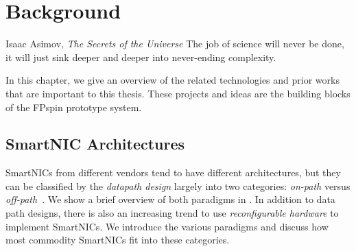 \chapter{Background}
\begin{chapquote}{Isaac Asimov, \textit{The Secrets of the Universe}}
The job of science will never be done, it will just sink deeper and deeper into never-ending complexity.
\end{chapquote}

In this chapter, we give an overview of the related technologies and prior works that are important to this thesis.  These projects and ideas are the building blocks of the FP\acs{spin} prototype system.

\section{SmartNIC Architectures}

SmartNICs from different vendors tend to have different architectures, but they can be classified by the \emph{datapath design} largely into two categories: \emph{on-path} versus \emph{off-path}~\cite{liu_offloading_2019, wei_characterizing_2023}.  We show a brief overview of both paradigms in .  In addition to data path designs, there is also an increasing trend to use \emph{reconfigurable hardware} to implement SmartNICs.  We introduce the various paradigms and discuss how most commodity SmartNICs fit into these categories.


